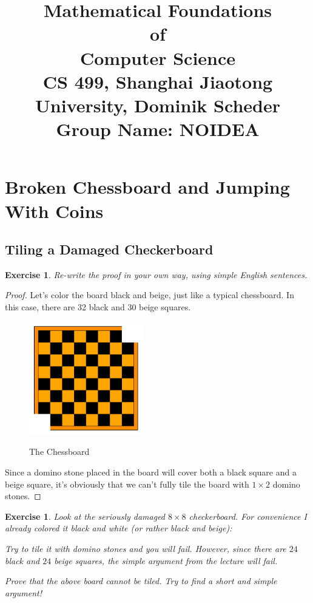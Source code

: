 \documentclass[12pt,a4]{article}
\date{}
\title{
	Mathematical Foundations \\of \\Computer Science\\
	\vspace{3mm}
	{\normalsize CS 499,	Shanghai Jiaotong University,  Dominik Scheder\\}
	{\normalsize Group Name: \textbf{NOIDEA}}
}
\theoremstyle{exercise}
\newtheorem{exercise}[theorem]{Exercise}
\begin{document}
\maketitle

\section{Broken Chessboard and Jumping With Coins}

\subsection{Tiling a Damaged Checkerboard}

\begin{exercise}
    Re-write the proof in your own way,  using simple English sentences.
\end{exercise}

\begin{proof}
	Let's color the board black and beige, just like a typical chessboard.
    In this case, there are 32 black and 30 beige squares.

    \begin{figure}[h]
        \small
        \centering
        \includegraphics[width=5cm]{slightlydamaged.png}
        \label{fig:slightlyDamagedBoard}
        \caption{The Chessboard}
    \end{figure}

    Since a domino stone placed in the board will cover both a black square and a beige square,
    it's obviously that we can't fully tile the board with $1 \times 2$ domino stones.

\end{proof}

\begin{exercise}
    Look at the seriously damaged $8 \times 8$ checkerboard.
    For convenience I already colored it black and white (or rather black and beige):

    Try to tile it with domino stones and you will fail.
    However, since there are $24$ black and $24$ beige squares, the simple argument from the lecture will fail.

    Prove that the above board cannot be tiled. Try to ﬁnd a short and simple argument!
\end{exercise}
\end{document}

